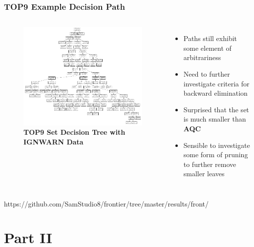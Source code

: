 \documentclass{beamer}
\begin{document}
\begin{frame}[t]
    \frametitle{TOP9 Example Decision Path}

    \begin{columns}[c]
    \column{6cm}
        \begin{figure}[htbp!]
            \centering
            \includegraphics[width=1\textwidth]{img/TOP9_IGNWARN_1.png}
            \tiny{\caption{\textbf{TOP9 Set Decision Tree with IGNWARN Data}}}
        \end{figure}
    \column{6cm}
        \begin{itemize}
            \item Paths still exhibit some element of arbitrariness
            \item Need to further investigate criteria for backward elimination
            \item Surprised that the set is much smaller than \textbf{AQC}
            \item Sensible to investigate some form of pruning to further remove
                smaller leaves
        \end{itemize}
    \end{columns}
    \centering
    \tiny{https://github.com/SamStudio8/frontier/tree/master/results/front/}
\end{frame}

\section{Part II}
\end{document}
